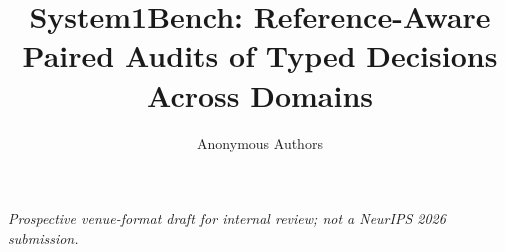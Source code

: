 \documentclass{article}
\title{System1Bench: Reference-Aware Paired Audits of Typed Decisions Across Domains}
\author{Anonymous Authors}
\begin{document}
\maketitle
\begin{center}
\vspace{-1.0em}\small\emph{Prospective venue-format draft for internal review; not a NeurIPS 2026 submission.}
\end{center}
\begin{abstract}

\end{abstract}








\FloatBarrier
\label{submission-main-end}



\clearpage
\appendix

\end{document}
